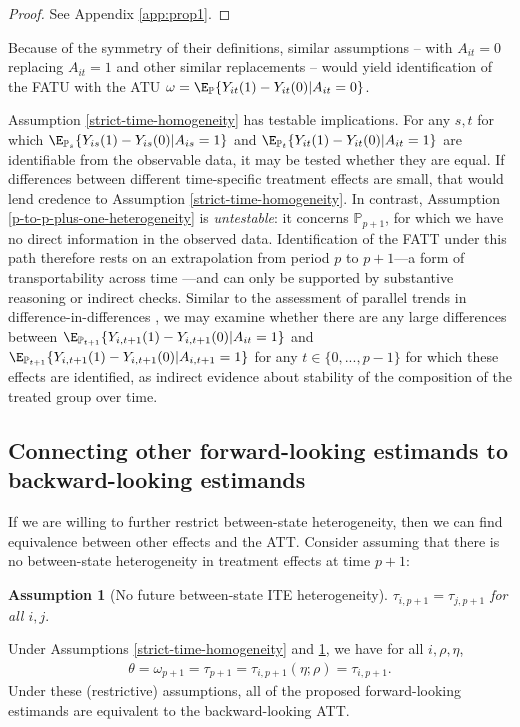 \documentclass{article}
\newtheorem{assumption}{Assumption}
\renewcommand{\P}{\mathbb{P}}
\begin{document}
\begin{proof}
See Appendix \ref{app:prop1}.
\end{proof}

\begin{remark}
    Because of the symmetry of their definitions, similar assumptions -- with $A_{it} = 0$ replacing $A_{it} = 1$ and other similar replacements -- would yield identification of the FATU with the ATU
        $\omega = \E_\P\{Y_{it}(1) - Y_{it}(0) | A_{it} = 0\}$.
\end{remark}

\begin{remark}
    Assumption \ref{strict-time-homogeneity} has testable implications. For any $s, t$ for which $\E_{\P_s}\{Y_{is}(1) - Y_{is}(0) | A_{is} = 1\}$ and $\E_{\P_t}\{Y_{it}(1) - Y_{it}(0) | A_{it} = 1\}$ are identifiable from the observable data, it may be tested whether they are equal. If differences between different time-specific treatment effects are small, that would lend credence to Assumption \ref{strict-time-homogeneity}. In contrast, Assumption \ref{p-to-p-plus-one-heterogeneity} is \emph{untestable}: it concerns $\P_{p+1}$, for which we have no direct information in the observed data. Identification of the FATT under this path therefore rests on an extrapolation from period $p$ to $p+1$---a form of transportability across time \citep{pearlExternalValidityCalculus2022,egamiElementsExternalValidity2023}---and can only be supported by substantive reasoning or indirect checks. Similar to the assessment of parallel trends in difference-in-differences \citep{sunEstimatingDynamicTreatment2021,wangAdvancesDifferenceindifferencesMethods2024a}, we may examine whether there are any large differences between $\E_{\P_{t+1}}\{Y_{i,t+1}(1) - Y_{i,t+1}(0) | A_{it} = 1\}$ and $\E_{\P_{t+1}}\{Y_{i,t+1}(1) - Y_{i,t+1}(0) | A_{i,t+1} = 1\}$ for any $t \in \{0, ..., p-1\}$ for which these effects are identified, as indirect evidence about stability of the composition of the treated group over time.
\end{remark}

\subsection{Connecting other forward-looking estimands to backward-looking estimands}

If we are willing to further restrict between-state heterogeneity, then we can find equivalence between other effects and the ATT. Consider assuming that there is no between-state heterogeneity in treatment effects at time $p+1$:
\begin{assumption}[No future between-state ITE heterogeneity]
    $\tau_{i,p+1} = \tau_{j,p+1}$ for all $i,j.$\label{strict-between-homogeneity}
\end{assumption}
Under Assumptions \ref{strict-time-homogeneity} and \ref{strict-between-homogeneity}, we have for all $i, \rho, \eta$,
\begin{align*}
    \theta = \omega_{p+1} = \tau_{p+1} = \tau_{i,p+1}(\eta; \rho) = \tau_{i,p+1}.
\end{align*}
Under these (restrictive) assumptions, all of the proposed forward-looking estimands are equivalent to the backward-looking ATT.
\end{document}
